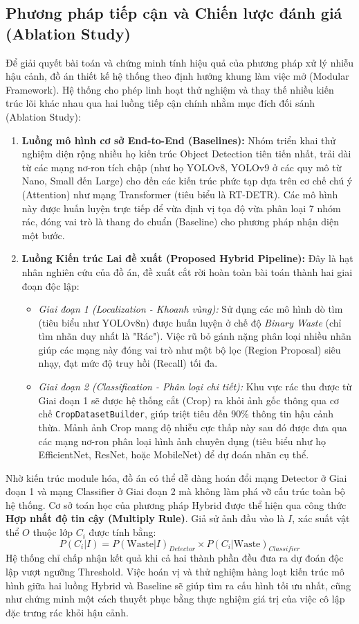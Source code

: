 \documentclass[12pt, a4paper]{article}
\begin{document}
\subsection{Phương pháp tiếp cận và Chiến lược đánh giá (Ablation Study)}
Để giải quyết bài toán và chứng minh tính hiệu quả của phương pháp xử lý nhiễu hậu cảnh, đồ án thiết kế hệ thống theo định hướng khung làm việc mở (Modular Framework). Hệ thống cho phép linh hoạt thử nghiệm và thay thế nhiều kiến trúc lõi khác nhau qua hai luồng tiếp cận chính nhằm mục đích đối sánh (Ablation Study):
\begin{enumerate}
    \item \textbf{Luồng mô hình cơ sở End-to-End (Baselines):} Nhóm triển khai thử nghiệm diện rộng nhiều họ kiến trúc Object Detection tiên tiến nhất, trải dài từ các mạng nơ-ron tích chập (như họ YOLOv8, YOLOv9 ở các quy mô từ Nano, Small đến Large) cho đến các kiến trúc phức tạp dựa trên cơ chế chú ý (Attention) như mạng Transformer (tiêu biểu là RT-DETR). Các mô hình này được huấn luyện trực tiếp để vừa định vị tọa độ vừa phân loại 7 nhóm rác, đóng vai trò là thang đo chuẩn (Baseline) cho phương pháp nhận diện một bước.
    \item \textbf{Luồng Kiến trúc Lai đề xuất (Proposed Hybrid Pipeline):} Đây là hạt nhân nghiên cứu của đồ án, đề xuất cắt rời hoàn toàn bài toán thành hai giai đoạn độc lập:
    \begin{itemize}
        \item \textit{Giai đoạn 1 (Localization - Khoanh vùng):} Sử dụng các mô hình dò tìm (tiêu biểu như YOLOv8n) được huấn luyện ở chế độ \textit{Binary Waste} (chỉ tìm nhãn duy nhất là "Rác"). Việc rũ bỏ gánh nặng phân loại nhiều nhãn giúp các mạng này đóng vai trò như một bộ lọc (Region Proposal) siêu nhạy, đạt mức độ truy hồi (Recall) tối đa.
        \item \textit{Giai đoạn 2 (Classification - Phân loại chi tiết):} Khu vực rác thu được từ Giai đoạn 1 sẽ được hệ thống cắt (Crop) ra khỏi ảnh gốc thông qua cơ chế \texttt{CropDatasetBuilder}, giúp triệt tiêu đến 90\% thông tin hậu cảnh thừa. Mảnh ảnh Crop mang độ nhiễu cực thấp này sau đó được đưa qua các mạng nơ-ron phân loại hình ảnh chuyên dụng (tiêu biểu như họ EfficientNet, ResNet, hoặc MobileNet) để dự đoán nhãn cụ thể.
    \end{itemize}
\end{enumerate}
Nhờ kiến trúc module hóa, đồ án có thể dễ dàng hoán đổi mạng Detector ở Giai đoạn 1 và mạng Classifier ở Giai đoạn 2 mà không làm phá vỡ cấu trúc toàn bộ hệ thống. Cơ sở toán học của phương pháp Hybrid được thể hiện qua công thức \textbf{Hợp nhất độ tin cậy (Multiply Rule)}. Giả sử ảnh đầu vào là $I$, xác suất vật thể $O$ thuộc lớp $C_i$ được tính bằng:
\begin{equation}
P(C_i|I) = P(\text{Waste}|I)_{Detector} \times P(C_i|\text{Waste})_{Classifier}
\end{equation}
Hệ thống chỉ chấp nhận kết quả khi cả hai thành phần đều đưa ra dự đoán độc lập vượt ngưỡng Threshold. Việc hoán vị và thử nghiệm hàng loạt kiến trúc mô hình giữa hai luồng Hybrid và Baseline sẽ giúp tìm ra cấu hình tối ưu nhất, cũng như chứng minh một cách thuyết phục bằng thực nghiệm giá trị của việc cô lập đặc trưng rác khỏi hậu cảnh.
\end{document}
